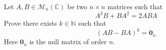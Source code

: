 Let $A,B\in \mathcal{M}_n(\mathbb{C})$ be two $n \times n$ matrices such that
\[ A^2B+BA^2=2ABA \]
Prove there exists $k\in \mathbb{N}$ such that
\[ (AB-BA)^k=\mathbf{0}_n\]
Here $\mathbf{0}_n$ is the null matrix of order $n$.